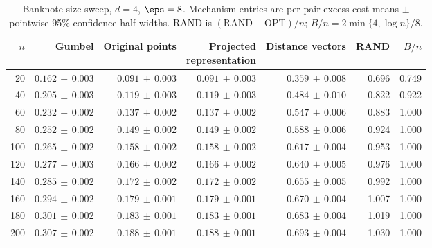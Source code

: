 \begin{table}[!htbp]
\centering\scriptsize
\setlength{\tabcolsep}{3pt}
\caption{Banknote size sweep, $d=4$, $\eps=8$. Mechanism entries are per-pair excess-cost means $\pm$ pointwise 95\% confidence half-widths. RAND is $(\mathrm{RAND}-\mathrm{OPT})/n$; $B/n=2\min\{4,\log n\}/8$.}
\label{tab:exp-banknote-values}
\begin{tabular}{rrrrrrr}
\toprule
$n$ & Gumbel & Original points & \shortstack{Projected\\representation} & Distance vectors & RAND & $B/n$\\
\midrule
20 & $0.162\,\pm\,0.003$ & $0.091\,\pm\,0.003$ & $0.091\,\pm\,0.003$ & $0.359\,\pm\,0.008$ & 0.696 & 0.749\\
40 & $0.205\,\pm\,0.003$ & $0.119\,\pm\,0.003$ & $0.119\,\pm\,0.003$ & $0.484\,\pm\,0.010$ & 0.822 & 0.922\\
60 & $0.232\,\pm\,0.002$ & $0.137\,\pm\,0.002$ & $0.137\,\pm\,0.002$ & $0.547\,\pm\,0.006$ & 0.883 & 1.000\\
80 & $0.252\,\pm\,0.002$ & $0.149\,\pm\,0.002$ & $0.149\,\pm\,0.002$ & $0.588\,\pm\,0.006$ & 0.924 & 1.000\\
100 & $0.265\,\pm\,0.002$ & $0.158\,\pm\,0.002$ & $0.158\,\pm\,0.002$ & $0.617\,\pm\,0.004$ & 0.953 & 1.000\\
120 & $0.277\,\pm\,0.003$ & $0.166\,\pm\,0.002$ & $0.166\,\pm\,0.002$ & $0.640\,\pm\,0.005$ & 0.976 & 1.000\\
140 & $0.285\,\pm\,0.002$ & $0.172\,\pm\,0.002$ & $0.172\,\pm\,0.002$ & $0.655\,\pm\,0.005$ & 0.992 & 1.000\\
160 & $0.294\,\pm\,0.002$ & $0.179\,\pm\,0.001$ & $0.179\,\pm\,0.001$ & $0.670\,\pm\,0.004$ & 1.007 & 1.000\\
180 & $0.301\,\pm\,0.002$ & $0.183\,\pm\,0.001$ & $0.183\,\pm\,0.001$ & $0.683\,\pm\,0.004$ & 1.019 & 1.000\\
200 & $0.307\,\pm\,0.002$ & $0.188\,\pm\,0.001$ & $0.188\,\pm\,0.001$ & $0.693\,\pm\,0.004$ & 1.030 & 1.000\\
\bottomrule
\end{tabular}
\end{table}

